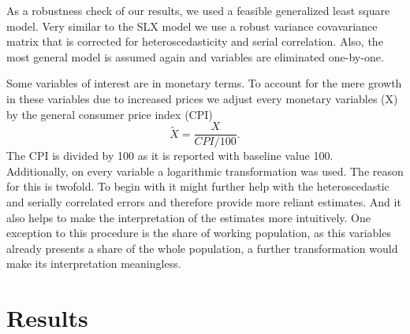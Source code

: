 \documentclass[
]{article}
\begin{document}
As a robustness check of our results, we used a feasible generalized least square model. Very similar to the SLX model we use a robust variance covavariance matrix that is corrected for heteroscedasticity and serial correlation. Also, the most general model is assumed again and variables are eliminated one-by-one.\par
Some variables of interest are in monetary terms. To account for the mere growth in these variables due to increased prices we adjust every monetary variables (X) by the general consumer price index (CPI)
$$\widetilde{X} = \frac{X}{CPI/100}.$$
The CPI is divided by 100 as it is reported with baseline value 100.\\
Additionally, on every variable a logarithmic transformation was used. The reason for this is twofold. To begin with it might further help with the heteroscedastic and serially correlated errors and therefore provide more reliant estimates. And it also helps to make the interpretation of the estimates more intuitively. One exception to this procedure is the share of working population, as this variables already presents a share of the whole population, a further transformation would make its interpretation meaningless.\\



\section{Results}
\end{document}

